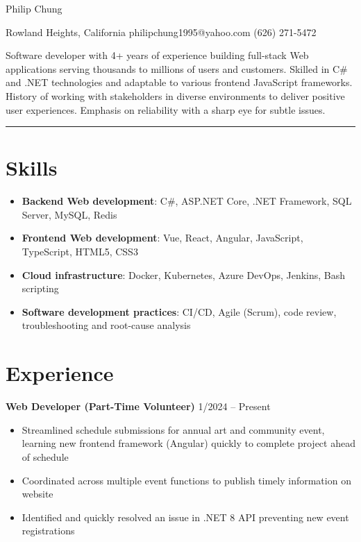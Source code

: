 \documentclass[12pt]{article}
\newcommand{\primaryheader}[4]{
	\textbf{#1}
	\ifthenelse{\equal{#3}{}}{}{%
		\symbol{"B7} #3 \ifthenelse{\equal{#4}{}}{}{(#4)}
	}
	\hfill #2%
}
\begin{document}
	{\centering

		{\headerfont\fontsize{24pt}{24pt}\selectfont Philip Chung}

		\vspace{0.25em}

		{\fontsize{10pt}{10pt}\selectfont Rowland Heights, California  philipchung1995@yahoo.com  (626) 271-5472}

	}

	\vspace{0.25em}

	{\fontsize{11pt}{14pt}\selectfont

		Software developer with 4+ years of experience building full-stack Web applications serving thousands to millions of users and customers. Skilled in C\# and .NET technologies and adaptable to various frontend JavaScript frameworks. History of working with stakeholders in diverse environments to deliver positive user experiences. Emphasis on reliability with a sharp eye for subtle issues.

	}

	\rule{\textwidth}{1pt}

	\section*{Skills}

	\newcommand{\skillitem}[2]{\item \textbf{#1}: #2}

	\begin{itemize}[left=0.25in .. 0.25in,label={},itemindent=-0.25in]
		\skillitem{Backend Web development}{C\#, ASP.NET Core, .NET Framework, SQL Server, MySQL, Redis}
		\skillitem{Frontend Web development}{Vue, React, Angular, JavaScript, TypeScript, HTML5, CSS3}
		\skillitem{Cloud infrastructure}{Docker, Kubernetes, Azure DevOps, Jenkins, Bash scripting}
		\skillitem{Software development practices}{CI/CD, Agile (Scrum), code review, troubleshooting and root-cause analysis}
	\end{itemize}

	\section*{Experience}

	\primaryheader{Web Developer (Part-Time Volunteer)}{1/2024 -- Present}{PNW}{Remote}

	\begin{itemize}
		\item Streamlined schedule submissions for annual art and community event, learning new frontend framework (Angular) quickly to complete project ahead of schedule
		\item Coordinated across multiple event functions to publish timely information on website
		\item Identified and quickly resolved an issue in .NET 8 API preventing new event registrations
	\end{itemize}
\end{document}
